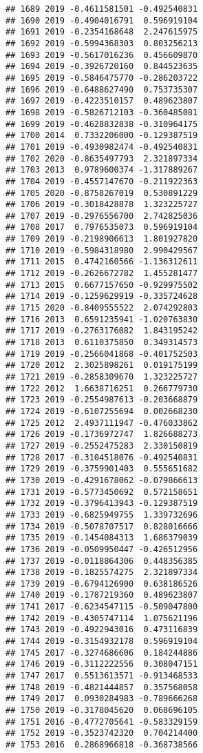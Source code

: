 \documentclass[
]{article}
\begin{document}
\begin{verbatim}
## 1689 2019 -0.4611581501 -0.492540831
## 1690 2019 -0.4904016791  0.596919104
## 1691 2019 -0.2354168648  2.247615975
## 1692 2019 -0.5994368303  0.803256213
## 1693 2019 -0.5617016236  0.456609870
## 1694 2019 -0.3926720160  0.844523635
## 1695 2019 -0.5846475770 -0.286203722
## 1696 2019 -0.6488627490  0.753735307
## 1697 2019 -0.4223510157  0.489623807
## 1698 2019 -0.5826712103 -0.360485081
## 1699 2019 -0.4628832838 -0.310964175
## 1700 2014  0.7332206000 -0.129387519
## 1701 2019 -0.4930982474 -0.492540831
## 1702 2020 -0.8635497793  2.321897334
## 1703 2013  0.9789600374 -1.317889267
## 1704 2019 -0.4557147670 -0.211922363
## 1705 2020 -0.8758267019  0.530891229
## 1706 2019 -0.3018428878  1.323225727
## 1707 2019 -0.2976556700  2.742825036
## 1708 2017  0.7976535073  0.596919104
## 1709 2019 -0.2198906613  1.801927820
## 1710 2019 -0.5984318980  2.990429567
## 1711 2015  0.4742160566 -1.136312611
## 1712 2019 -0.2626672782  1.455281477
## 1713 2015  0.6677157650 -0.929975502
## 1714 2019 -0.1259629919 -0.335724628
## 1715 2020 -0.8409555522  2.074292803
## 1716 2013  0.6591235941 -1.020763830
## 1717 2019 -0.2763176082  1.843195242
## 1718 2013  0.6110375850  0.349314573
## 1719 2019 -0.2566041868 -0.401752503
## 1720 2012  2.3025898261  0.019175199
## 1721 2019 -0.2858309670  1.323225727
## 1722 2012  1.6638716251  0.266779730
## 1723 2019 -0.2554987613 -0.203668879
## 1724 2019 -0.6107255694  0.002668230
## 1725 2012  2.4937111947 -0.476033862
## 1726 2019 -0.1736972747  1.826688273
## 1727 2019 -0.2552475283  2.330150819
## 1728 2017 -0.3104518076 -0.492540831
## 1729 2019 -0.3759901403  0.555651682
## 1730 2019 -0.4291678062 -0.079866613
## 1731 2019 -0.5773450692  0.572158651
## 1732 2019 -0.3796413943 -0.129387519
## 1733 2019 -0.6825949755  1.339732696
## 1734 2019 -0.5078707517  0.828016666
## 1735 2019 -0.1454084313  1.686379039
## 1736 2019 -0.0509950447 -0.426512956
## 1737 2019 -0.0118864306  0.448356385
## 1738 2019 -0.1825574275  2.321897334
## 1739 2019 -0.6794126900  0.638186526
## 1740 2019 -0.1787219360  0.489623807
## 1741 2017 -0.6234547115 -0.509047800
## 1742 2019 -0.4305747114  1.075621196
## 1743 2019 -0.4922943016  0.473116839
## 1744 2019 -0.3154932178  0.596919104
## 1745 2017 -0.3274686606  0.184244886
## 1746 2019 -0.3112222556  0.308047151
## 1747 2017  0.5513613571 -0.913468533
## 1748 2019 -0.4821444857  0.357568058
## 1749 2017  0.0930284983 -0.789666268
## 1750 2019 -0.3178045620  0.068696105
## 1751 2016 -0.4772705641 -0.583329159
## 1752 2019 -0.3523742320  0.704214400
## 1753 2016  0.2868966818 -0.368738566

\end{verbatim}
\end{document}

